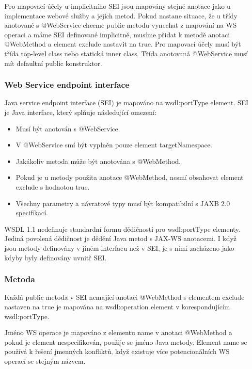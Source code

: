\documentclass[11pt,twoside,a4paper]{book}
\begin{document}
Pro mapovací účely u implicitního SEI jsou mapovány stejné anotace jako u implementace
webové služby a jejích metod. Pokud nastane situace, že u třídy anotované s @WebService
chceme public metodu vynechat z mapování na WS operaci a máme SEI definované
implicitně, musíme přidat k metodě anotaci @WebMethod a element exclude nastavit na true.
Pro mapovací účely musí být třída top-level class nebo statická inner class. Třída anotovaná
@WebService musí mít defaultní public konstruktor.

\subsubsection{Web Service endpoint interface}
Java service endpoint interface (SEI) je mapováno na wsdl:portType element. SEI je Java
interface, který splňuje následující omezení:

\begin{itemize}
  \item Musí být anotován s @WebService.
  \item V @WebService smí být vyplněn pouze element targetNamespace.
  \item Jakákoliv metoda může být anotována s @WebMethod.
  \item Pokud je u metody použita anotace @WebMethod, nesmí obsahovat element exclude s
hodnotou true.
  \item Všechny parametry a návratové typy musí být kompatibilní s JAXB 2.0 specifikací.
\end{itemize}

WSDL 1.1 nedefinuje standardní formu dědičnosti pro wsdl:portType elementy. Jediná
povolená dědičnost je dědění Java metod s JAX-WS anotacemi. I když jsou metody
definovány v jiném interfacu než v SEI, je s nimi zacházeno jako kdyby byly definovány
uvnitř SEI.

\subsubsection{Metoda}

Každá public metoda v SEI nemající anotaci @WebMethod s elementem exclude nastaven na
true je mapována na wsdl:operation element v korespondujícím wsdl:portType.

Jméno WS operace je mapováno z elementu name v anotaci @WebMethod a pokud je
element nespecifikován, použije se jméno Java metody. Element name se používá k řešení
jmenných konfliktů, když existuje více potencionálních WS operací se stejným názvem.
\end{document}

